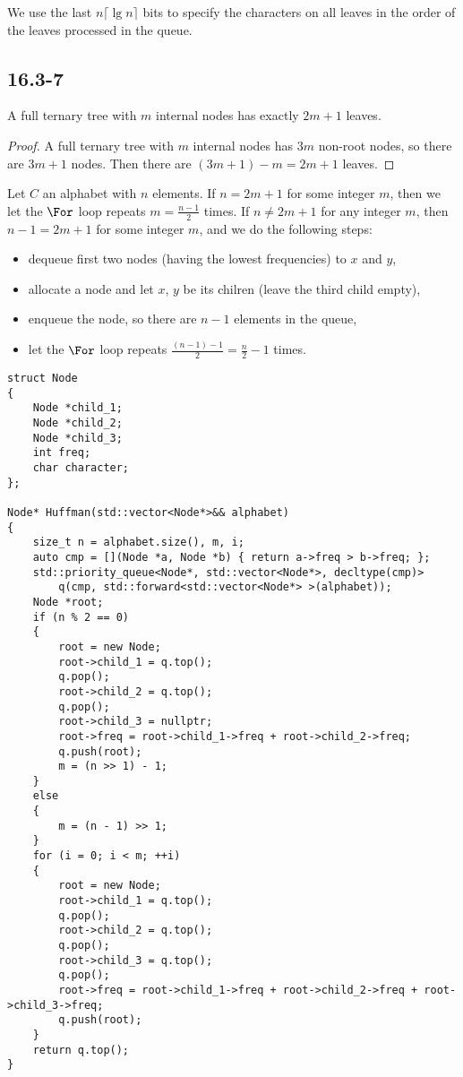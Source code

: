 We use the last $n \lceil \lg n \rceil$ bits 
to specify the characters on all leaves in the order of the leaves 
processed in the queue.

\subsection*{16.3-7}

\begin{claim}
    A full ternary tree with $m$ internal nodes
    has exactly $2m + 1$ leaves.
\end{claim}

\begin{proof}
    A full ternary tree with $m$ internal nodes
    has $3m$ non-root nodes, so there are $3m + 1$ nodes.
    Then there are $(3m + 1) - m = 2m + 1$ leaves.
\end{proof}

Let $C$ an alphabet with $n$ elements.
If $n = 2m + 1$ for some integer $m$, 
then we let the $\For$ loop repeats $m = \frac{n - 1}{2}$ times. 
If $n \neq 2m + 1$ for any integer $m$,
then $n - 1 = 2m + 1$ for some integer $m$,
and we do the following steps:
\begin{itemize}
	\item dequeue first two nodes (having the lowest frequencies) 
        to $x$ and $y$, 
	\item allocate a node and let $x$, $y$ be its chilren 
        (leave the third child empty), 
	\item enqueue the node, so there are $n - 1$ elements in the queue, 
	\item let the $\For$ loop repeats 
    $\frac{(n - 1) - 1}{2} = \frac{n}{2} - 1$ times. 
\end{itemize}

\begin{verbatim}
struct Node
{
    Node *child_1;
    Node *child_2;
    Node *child_3;
    int freq;
    char character;
};

Node* Huffman(std::vector<Node*>&& alphabet)
{
    size_t n = alphabet.size(), m, i;
    auto cmp = [](Node *a, Node *b) { return a->freq > b->freq; };
    std::priority_queue<Node*, std::vector<Node*>, decltype(cmp)> 
        q(cmp, std::forward<std::vector<Node*> >(alphabet));
    Node *root;
    if (n % 2 == 0)
    {
        root = new Node;
        root->child_1 = q.top();
        q.pop();
        root->child_2 = q.top();
        q.pop();
        root->child_3 = nullptr;
        root->freq = root->child_1->freq + root->child_2->freq;
        q.push(root);
        m = (n >> 1) - 1;
    }
    else
    {
        m = (n - 1) >> 1;
    }
    for (i = 0; i < m; ++i)
    {
        root = new Node;
        root->child_1 = q.top();
        q.pop();
        root->child_2 = q.top();
        q.pop();
        root->child_3 = q.top();
        q.pop();
        root->freq = root->child_1->freq + root->child_2->freq + root->child_3->freq;
        q.push(root);
    }
    return q.top();
}
\end{verbatim}

